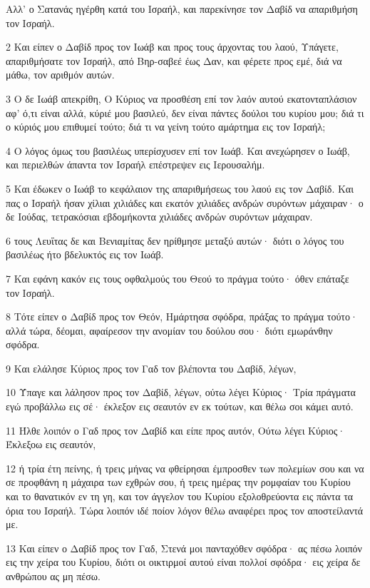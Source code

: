 \par Αλλ' ο Σατανάς ηγέρθη κατά του Ισραήλ, και παρεκίνησε τον Δαβίδ να απαριθμήση τον Ισραήλ.
\par 2 Και είπεν ο Δαβίδ προς τον Ιωάβ και προς τους άρχοντας του λαού, Υπάγετε, απαριθμήσατε τον Ισραήλ, από Βηρ-σαβεέ έως Δαν, και φέρετε προς εμέ, διά να μάθω, τον αριθμόν αυτών.
\par 3 Ο δε Ιωάβ απεκρίθη, Ο Κύριος να προσθέση επί τον λαόν αυτού εκατονταπλάσιον αφ' ό,τι είναι αλλά, κύριέ μου βασιλεύ, δεν είναι πάντες δούλοι του κυρίου μου; διά τι ο κύριός μου επιθυμεί τούτο; διά τι να γείνη τούτο αμάρτημα εις τον Ισραήλ;
\par 4 Ο λόγος όμως του βασιλέως υπερίσχυσεν επί τον Ιωάβ. Και ανεχώρησεν ο Ιωάβ, και περιελθών άπαντα τον Ισραήλ επέστρεψεν εις Ιερουσαλήμ.
\par 5 Και έδωκεν ο Ιωάβ το κεφάλαιον της απαριθμήσεως του λαού εις τον Δαβίδ. Και πας ο Ισραήλ ήσαν χίλιαι χιλιάδες και εκατόν χιλιάδες ανδρών συρόντων μάχαιραν· ο δε Ιούδας, τετρακόσιαι εβδομήκοντα χιλιάδες ανδρών συρόντων μάχαιραν.
\par 6 τους Λευΐτας δε και Βενιαμίτας δεν ηρίθμησε μεταξύ αυτών· διότι ο λόγος του βασιλέως ήτο βδελυκτός εις τον Ιωάβ.
\par 7 Και εφάνη κακόν εις τους οφθαλμούς του Θεού το πράγμα τούτο· όθεν επάταξε τον Ισραήλ.
\par 8 Τότε είπεν ο Δαβίδ προς τον Θεόν, Ημάρτησα σφόδρα, πράξας το πράγμα τούτο· αλλά τώρα, δέομαι, αφαίρεσον την ανομίαν του δούλου σου· διότι εμωράνθην σφόδρα.
\par 9 Και ελάλησε Κύριος προς τον Γαδ τον βλέποντα του Δαβίδ, λέγων,
\par 10 Ύπαγε και λάλησον προς τον Δαβίδ, λέγων, ούτω λέγει Κύριος· Τρία πράγματα εγώ προβάλλω εις σέ· έκλεξον εις σεαυτόν εν εκ τούτων, και θέλω σοι κάμει αυτό.
\par 11 Ήλθε λοιπόν ο Γαδ προς τον Δαβίδ και είπε προς αυτόν, Ούτω λέγει Κύριος· Έκλεξοω εις σεαυτόν,
\par 12 ή τρία έτη πείνης, ή τρεις μήνας να φθείρησαι έμπροσθεν των πολεμίων σου και να σε προφθάνη η μάχαιρα των εχθρών σου, ή τρεις ημέρας την ρομφαίαν του Κυρίου και το θανατικόν εν τη γη, και τον άγγελον του Κυρίου εξολοθρεύοντα εις πάντα τα όρια του Ισραήλ. Τώρα λοιπόν ιδέ ποίον λόγον θέλω αναφέρει προς τον αποστείλαντά με.
\par 13 Και είπεν ο Δαβίδ προς τον Γαδ, Στενά μοι πανταχόθεν σφόδρα· ας πέσω λοιπόν εις την χείρα του Κυρίου, διότι οι οικτιρμοί αυτού είναι πολλοί σφόδρα· εις χείρα δε ανθρώπου ας μη πέσω.
